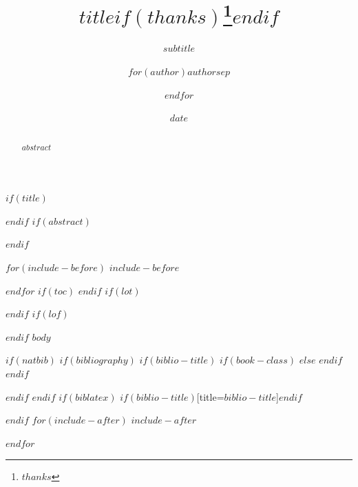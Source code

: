 \documentclass[$if(fontsize)$$fontsize$,$endif$$if(lang)$$babel-lang$,$endif$$if(papersize)$$papersize$paper,$endif$$for(classoption)$$classoption$$sep$,$endfor$]{$documentclass$}
\title{$title$$if(thanks)$\thanks{$thanks$}$endif$}
\subtitle{$subtitle$}
\author{$for(author)$$author$$sep$ \and $endfor$}
\institute{$for(institute)$$institute$$sep$ \and $endfor$}
\date{$date$}
\begin{document}
$if(title)$
\maketitle
$endif$
$if(abstract)$
\begin{abstract}
$abstract$
\end{abstract}
$endif$

$for(include-before)$
$include-before$

$endfor$
$if(toc)$
{
\setcounter{tocdepth}{$toc-depth$}
\tableofcontents
}
$endif$
$if(lot)$
\listoftables
$endif$
$if(lof)$
\listoffigures
$endif$
$body$

$if(natbib)$
$if(bibliography)$
$if(biblio-title)$
$if(book-class)$
\renewcommand\bibname{$biblio-title$}
$else$
\renewcommand\refname{$biblio-title$}
$endif$
$endif$


$endif$
$endif$
$if(biblatex)$
\printbibliography$if(biblio-title)$[title=$biblio-title$]$endif$

$endif$
$for(include-after)$
$include-after$

$endfor$
\end{document}
